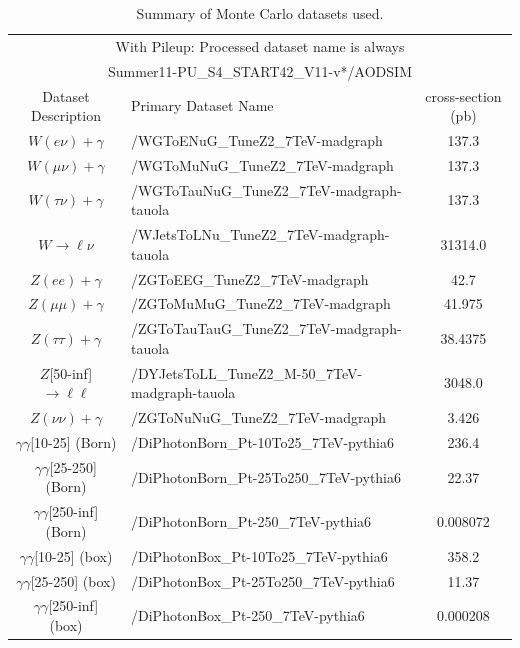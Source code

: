 \begin{table}[!ht]
\begin{center}
{\footnotesize
\begin{tabular}{|c|l|c|}
\hline
\multicolumn{3}{|c|}{With Pileup: Processed dataset name is always} \\
\multicolumn{3}{|c|}{Summer11-PU\_S4\_START42\_V11-v*/AODSIM} \\
\hline
 Dataset Description                     &   Primary Dataset Name   & cross-section (pb)\\
\hline
$W(e\nu)+\gamma$                    &	/WGToENuG\_TuneZ2\_7TeV-madgraph		  &  137.3 \\
$W(\mu\nu)+\gamma$                  &	/WGToMuNuG\_TuneZ2\_7TeV-madgraph		  &  137.3 \\
$W(\tau\nu)+\gamma$                 &	/WGToTauNuG\_TuneZ2\_7TeV-madgraph-tauola	  &  137.3 \\
$W\rightarrow\ell\nu$               &	/WJetsToLNu\_TuneZ2\_7TeV-madgraph-tauola	  &  31314.0 \\
$Z(ee)+\gamma$                      &	/ZGToEEG\_TuneZ2\_7TeV-madgraph 		  &  42.7 \\
$Z(\mu\mu)+\gamma$                  &	/ZGToMuMuG\_TuneZ2\_7TeV-madgraph		  &  41.975 \\
$Z(\tau\tau)+\gamma$                &	/ZGToTauTauG\_TuneZ2\_7TeV-madgraph-tauola	  &  38.4375 \\
$Z$[50-inf] $\rightarrow\ell\ell$   &	/DYJetsToLL\_TuneZ2\_M-50\_7TeV-madgraph-tauola   &  3048.0 \\
$Z(\nu\nu)+\gamma$                  &	/ZGToNuNuG\_TuneZ2\_7TeV-madgraph		  &  3.426 \\
$\gamma\gamma$[10-25] (Born)        &	/DiPhotonBorn\_Pt-10To25\_7TeV-pythia6  	  &  236.4 \\
$\gamma\gamma$[25-250] (Born)       &	/DiPhotonBorn\_Pt-25To250\_7TeV-pythia6 	  &  22.37 \\
$\gamma\gamma$[250-inf] (Born)      &	/DiPhotonBorn\_Pt-250\_7TeV-pythia6		  &  0.008072 \\
$\gamma\gamma$[10-25] (box)         &	/DiPhotonBox\_Pt-10To25\_7TeV-pythia6		  &  358.2 \\
$\gamma\gamma$[25-250] (box)        &	/DiPhotonBox\_Pt-25To250\_7TeV-pythia6  	  &  11.37 \\
$\gamma\gamma$[250-inf] (box)       &	/DiPhotonBox\_Pt-250\_7TeV-pythia6		  &  0.000208 \\
\hline
\end{tabular}
}
\caption{Summary of Monte Carlo datasets used.}
\label{tab:DatasetsMCPhoJets}
\end{center}
\end{table}

